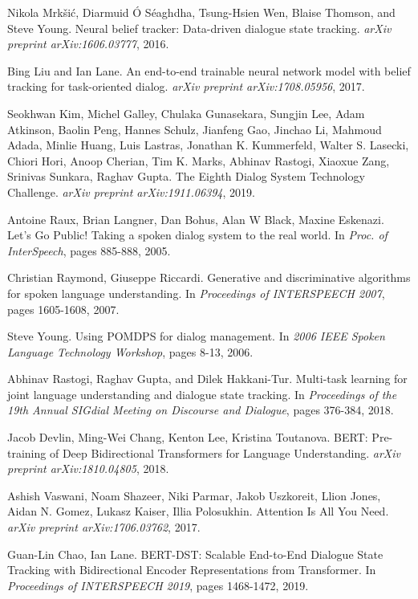\begin{thebibliography}{9}
     Nikola Mrk\v{s}i\'c, Diarmuid \'O S\'eaghdha, Tsung-Hsien Wen, Blaise Thomson, and Steve Young.  Neural belief tracker:  Data-driven dialogue state tracking. \textit{arXiv preprint arXiv:1606.03777}, 2016.

   Bing Liu and Ian Lane. An end-to-end trainable neural network model with belief tracking for task-oriented dialog. \textit{arXiv preprint arXiv:1708.05956}, 2017.

   Seokhwan Kim, Michel Galley, Chulaka Gunasekara, Sungjin Lee, Adam Atkinson, Baolin Peng, Hannes Schulz, Jianfeng Gao, Jinchao Li, Mahmoud Adada, Minlie Huang, Luis Lastras, Jonathan K. Kummerfeld, Walter S. Lasecki, Chiori Hori, Anoop Cherian, Tim K. Marks, Abhinav Rastogi, Xiaoxue Zang, Srinivas Sunkara, Raghav Gupta. The Eighth Dialog System Technology Challenge. \textit{arXiv preprint arXiv:1911.06394}, 2019.

   Antoine Raux, Brian Langner, Dan Bohus, Alan W Black, Maxine Eskenazi. Let's Go Public! Taking a spoken dialog system to the real world. In \textit{Proc. of InterSpeech}, pages 885-888, 2005.

   Christian Raymond, Giuseppe Riccardi. Generative and discriminative algorithms for spoken language understanding. In \textit{Proceedings of INTERSPEECH 2007}, pages 1605-1608, 2007.

   Steve Young. Using POMDPS for dialog management. In \textit{2006 IEEE Spoken Language Technology Workshop}, pages 8-13, 2006.

    Abhinav Rastogi, Raghav Gupta, and Dilek Hakkani-Tur. Multi-task learning for joint language understanding and dialogue state tracking. In \textit{Proceedings of the 19th Annual SIGdial Meeting on Discourse and Dialogue}, pages 376-384, 2018.

   Jacob Devlin, Ming-Wei Chang, Kenton Lee, Kristina Toutanova. BERT: Pre-training of Deep Bidirectional Transformers for Language Understanding. \textit{arXiv preprint arXiv:1810.04805}, 2018.

   Ashish Vaswani, Noam Shazeer, Niki Parmar, Jakob Uszkoreit, Llion Jones, Aidan N. Gomez, Lukasz Kaiser, Illia Polosukhin. Attention Is All You Need. \textit{arXiv preprint arXiv:1706.03762}, 2017.

   Guan-Lin Chao, Ian Lane. BERT-DST: Scalable End-to-End Dialogue State Tracking with Bidirectional Encoder Representations from Transformer. In \textit{Proceedings of INTERSPEECH 2019}, pages 1468-1472, 2019.
  

\end{thebibliography}
